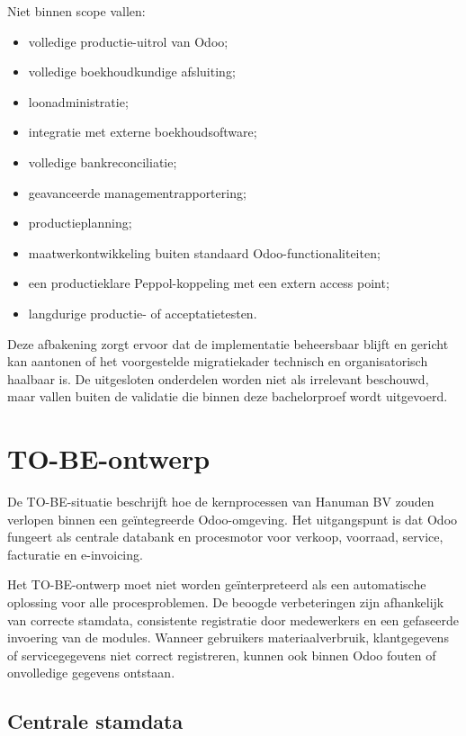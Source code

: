 Niet binnen scope vallen:

\begin{itemize}
    \item volledige productie-uitrol van Odoo;
    \item volledige boekhoudkundige afsluiting;
    \item loonadministratie;
    \item integratie met externe boekhoudsoftware;
    \item volledige bankreconciliatie;
    \item geavanceerde managementrapportering;
    \item productieplanning;
    \item maatwerkontwikkeling buiten standaard Odoo-functionaliteiten;
    \item een productieklare Peppol-koppeling met een extern access point;
    \item langdurige productie- of acceptatietesten.
\end{itemize}

Deze afbakening zorgt ervoor dat de implementatie beheersbaar blijft en gericht kan aantonen of het voorgestelde migratiekader technisch en organisatorisch haalbaar is. De uitgesloten onderdelen worden niet als irrelevant beschouwd, maar vallen buiten de validatie die binnen deze bachelorproef wordt uitgevoerd.

\section{TO-BE-ontwerp}
\label{sec:tobe-ontwerp}

De TO-BE-situatie beschrijft hoe de kernprocessen van Hanuman BV zouden verlopen binnen een geïntegreerde Odoo-omgeving. Het uitgangspunt is dat Odoo fungeert als centrale databank en procesmotor voor verkoop, voorraad, service, facturatie en e-invoicing.

Het TO-BE-ontwerp moet niet worden geïnterpreteerd als een automatische oplossing voor alle procesproblemen. De beoogde verbeteringen zijn afhankelijk van correcte stamdata, consistente registratie door medewerkers en een gefaseerde invoering van de modules. Wanneer gebruikers materiaalverbruik, klantgegevens of servicegegevens niet correct registreren, kunnen ook binnen Odoo fouten of onvolledige gegevens ontstaan.

\subsection{Centrale stamdata}

